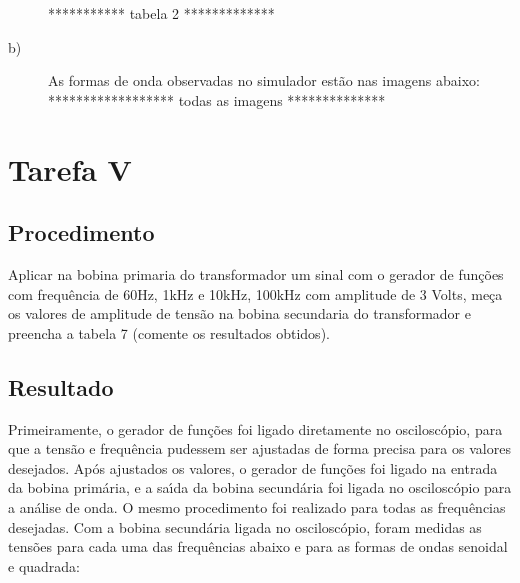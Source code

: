 \begin{description}
  
*********** tabela 2 ************* \\

  \item[b)] As formas de onda observadas no simulador est\~{a}o nas imagens abaixo: \\

  ****************** todas as imagens ************** \\
\end{description}

\section{Tarefa V}
\subsection{Procedimento}
Aplicar na bobina primaria do transformador um sinal com o gerador de fun\c{c}\~{o}es com frequ\^{e}ncia de 60Hz, 1kHz e 10kHz, 100kHz com amplitude de 3 Volts, me\c{c}a os valores de amplitude de tens\~{a}o na bobina secundaria do transformador e preencha a tabela 7 (comente os resultados obtidos).
\subsection{Resultado}
Primeiramente, o gerador de fun\c{c}\~{o}es foi ligado diretamente no oscilosc\'{o}pio, para que a tens\~{a}o e frequ\^{e}ncia pudessem ser ajustadas de forma precisa para os valores desejados. Ap\'{o}s ajustados os valores, o gerador de fun\c{c}\~{o}es foi ligado na entrada da bobina prim\'{a}ria, e a sa\'{\i}da da bobina secund\'{a}ria foi ligada no oscilosc\'{o}pio para a an\'{a}lise de onda. O mesmo procedimento foi realizado para todas as frequ\^{e}ncias desejadas. Com a bobina secund\'{a}ria ligada no oscilosc\'{o}pio, foram medidas as tens\~{o}es para cada uma das frequ\^{e}ncias abaixo e para as formas de ondas senoidal e quadrada: \\

